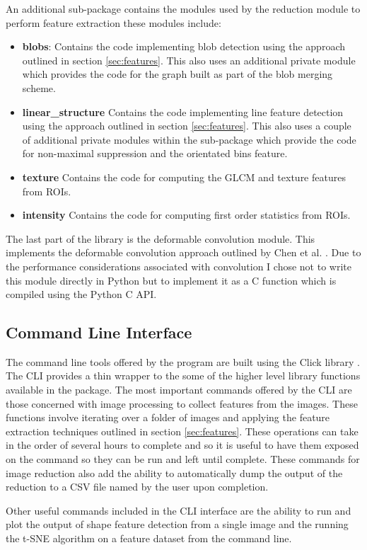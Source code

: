 An additional sub-package contains the modules used by the reduction module to perform feature extraction these modules include:

\begin{itemize}
	\item {\bf blobs}: Contains the code implementing blob detection using the approach outlined in section \ref{sec:features}. This also uses an additional private module which provides the code for the graph built as part of the blob merging scheme.
	\item {\bf linear\_structure} Contains the code implementing line feature detection using the approach outlined in section \ref{sec:features}. This also uses a couple of additional private modules within the sub-package which provide the code for non-maximal suppression and the orientated bins feature. 
	\item {\bf texture} Contains the code for computing the GLCM and texture features from ROIs.
	\item {\bf intensity} Contains the code for computing first order statistics from ROIs.
\end{itemize}

The last part of the library is the deformable convolution module. This implements the deformable convolution approach outlined by Chen et al. \cite{chen2013multiscale}. Due to the performance considerations associated with convolution I chose not to write this module directly in Python but to implement it as a C function which is compiled using the Python C API.

\subsection{Command Line Interface}
The command line tools offered by the program are built using the Click library \cite{clickLibrary}. The CLI provides a thin wrapper to the some of the higher level library functions available in the package. The most important commands offered by the CLI are those concerned with image processing to collect features from the images. These functions involve iterating over a folder of images and applying the feature extraction techniques outlined in section  \ref{sec:features}. These operations can take in the order of several hours to complete and so it is useful to have them exposed on the command so they can be run and left until complete. These commands for image reduction also add the ability to automatically dump the output of the reduction to a CSV file named by the user upon completion. 

Other useful commands included in the CLI interface are the ability to run and plot the output of shape feature detection from a single image and the running the t-SNE algorithm on a feature dataset from the command line.





